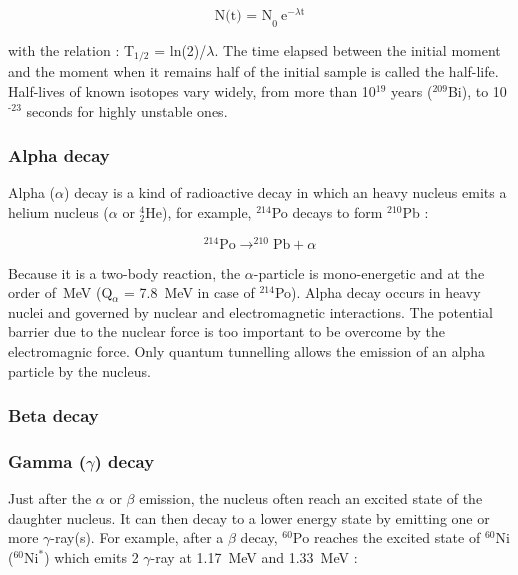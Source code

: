 \documentclass[main.tex]{subfiles}
\begin{document}
\begin{equation}
\text{N(t) = N}_\text{0}~\text{e} ^{-\lambda\text{t}}
\end{equation}


\NI with the relation : T$_{\text{1/2}}$ = ln(2)/$\lambda$. The time elapsed between the initial moment and the moment when it remains half of the initial sample is called the half-life. Half-lives of known isotopes vary widely, from more than 10$^{\text{19}}$ years ($^{\text{209}}$Bi), to 10$^{\text{-23}}$ seconds for highly unstable ones.


\subsubsection{Alpha decay}


\NI Alpha ($\alpha$) decay is a kind of radioactive decay in which an heavy nucleus emits a helium nucleus ($\alpha$ or $^{\text{4}}_{\text{2}}$He), for example, $^{\text{214}}$Po decays to form $^{\text{210}}$Pb :


\begin{equation}
 ^{\text{214}}\text{Po} \rightarrow  ^{\text{210}}\text{Pb} + \alpha
\end{equation} 


\NI Because it is a two-body reaction, the $\alpha$-particle is mono-energetic and at the order of~MeV (Q$_{\alpha}$ = 7.8~MeV in case of $^{\text{214}}$Po). Alpha decay occurs in heavy nuclei and governed by nuclear and electromagnetic interactions. The potential barrier due to the nuclear force is too important to be overcome by the electromagnic force. Only quantum tunnelling allows the emission of an alpha particle by the nucleus.


\subsubsection{Beta decay}




 
\subsubsection{Gamma ($\gamma$) decay}


\NI Just after the $\alpha$ or $\beta$ emission, the nucleus often reach an excited state of the daughter nucleus. It can then decay to a lower energy state by emitting one or more $\gamma$-ray(s). For example, after a $\beta$ decay, $^{\text{60}}\text{Po}$ reaches the excited state of $^{\text{60}}\text{Ni}$ ($^{\text{60}}\text{Ni}^\ast$) which emits 2 $\gamma$-ray at 1.17~MeV and 1.33~MeV : 
\end{document}
